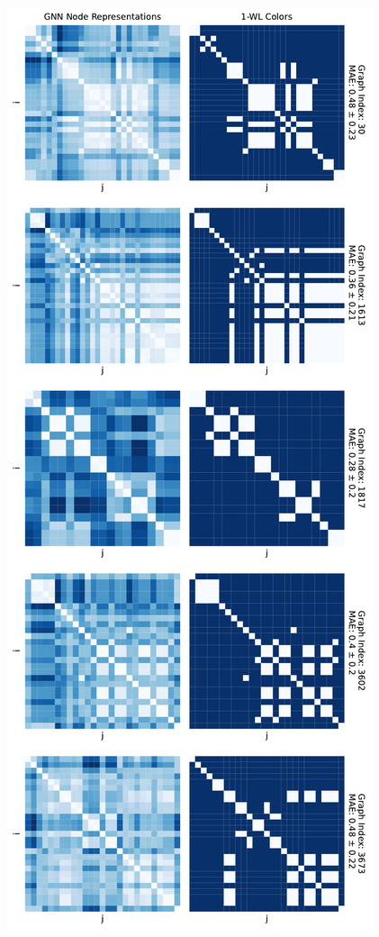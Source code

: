 \begin{figure}[!ht]
    \centering
    \begin{minipage}[b]{0.45992852703\textwidth}
        \centering
        \includegraphics[width=\textwidth, left]{Figures/heatmaps_NCI1_0_k_wl_1.pdf}

\end{minipage}
\end{figure}
